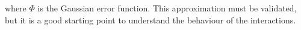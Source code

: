 \documentclass[10pt, lettersize, journal, onecolumn]{IEEEtran}
\begin{document}
where $\Phi$ is the Gaussian error function.
This approximation must be validated, but it is a good starting point to understand the behaviour of the interactions.
\begin{comment}
Si noti come questa espressione sia molto simile con quella derivata tramite l'approssimazione di Papoulis \cite[eq. 10]{Dar_2013} (in questo caso abbiamo assunto $z_m \in [0, L]$).
Inoltre, mentre l'approssimazione originaria è valida solo a partire da una lunghezza di dispersione ($z_0 = \beta_2/T_0^2$), la (\ref{eq:solution}) è valida \textit{sempre} per impulsi Gaussiani.

Quanto ottenuto nella (\ref{eq:solution}) fa sospettare che lo stesso risultato sarebbe stato ottenibile usando l'approssimazione in modo esatto. Infatti un aspetto fondamentale del ragionamento in \cite{Dar_2013} è che gli impulsi siano proporzionali e scalati rispetto ai loro \textit{spettri}. Questo per un impulso Gaussiano è sempre vero. 

\vspace{20pt}
Verifichiamo se l'approssimazione vale in modo esatto: scriviamo i campi in dominio del tempo e della frequenza e confrontiamoli con la \cite[eq. 10]{Dar_2013}. Secondo l'Appendice 1, nel dominio del tempo abbiamo questa espressione equivalente
\begin{align}
	u(z, t) = U_0 \left(\dfrac{1+iD(z)}{1+D^2(z)}\right)^{\frac{1}{2}} \exp\left[-\dfrac{t^2}{2T_0^2} \dfrac{1+iD(z)}{1+D^2(z)}\right]
\end{align}
Mentre nel dominio della frequenza si ha (trasformata standard)
\begin{equation}
	\hat{u}(z, \omega) = U_0 T_0 \exp\left[-\dfrac{1}{2} \omega^2 (T_0^2 - i\beta_2z)\right]	
\end{equation}
ora si sostituisce $\omega \leftarrow \frac{t}{\beta_2z}$ e si ottiene 

\begin{align}
	\hat{u}(z, \omega) &= U_0 T_0 \exp\left[-\dfrac{t^2}{2\beta_2^2 z^2} (T_0^2 - i\beta_2z)\right]\\
	&= U_0 T_0 \exp\left[-\dfrac{t^2}{2T_0^2} \left(\dfrac{1}{D^2(z)} - i\dfrac{1}{D(z)}\right)\right] \\
	&= U_0 T_0 \exp\left[-\dfrac{t^2}{2T_0^2} \left(\dfrac{1-iD(z)}{D^2(z)}\right)\right] 
\end{align}
Osserviamo l'approssimazione
\begin{equation}
	u(z, t) \approx \sqrt{\frac{i}{2\pi \beta_2 z}} \underbrace{\exp\left[-i\frac{t^2}{2 \beta_2 z}\right] \hat{u}\left(0, \frac{t}{\beta_2 z}\right)}_{A}
\end{equation}
il termine contrassegnato da $A$ risulta
\begin{equation}
	A = U_0 T_0 \exp\left[-i\frac{t^2}{2 T_0^2} \dfrac{1}{D(z)}\right]\exp\left[-\dfrac{t^2}{2T_0^2} \left(\dfrac{1-iD(z)}{D^2(z)}\right)\right] = U_0 T_0 \exp\left[-\dfrac{t^2}{2T_0^2} \left(\dfrac{1}{D^2(z)}\right)\right]
\end{equation}


\end{comment}
\end{document}
